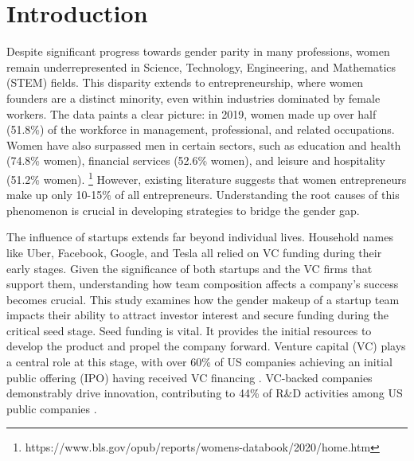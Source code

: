 

\pagestyle{plain} 


\section{Introduction} \label{sec:introduction}



Despite significant progress towards gender parity in many professions, women remain underrepresented in Science, Technology, Engineering, and Mathematics (STEM) fields. This disparity extends to entrepreneurship, where women founders are a distinct minority, even within industries dominated by female workers. The data paints a clear picture: in 2019, women made up over half (51.8\%) of the workforce in management, professional, and related occupations. Women have also surpassed men in certain sectors, such as education and health (74.8\% women), financial services (52.6\% women), and leisure and hospitality (51.2\% women). \footnote[1]{https://www.bls.gov/opub/reports/womens-databook/2020/home.htm} However, existing literature suggests that women entrepreneurs make up only 10-15\% of all entrepreneurs. Understanding the root causes of this phenomenon is crucial in developing strategies to bridge the gender gap.

The influence of startups extends far beyond individual lives. Household names like Uber, Facebook, Google, and Tesla all relied on VC funding during their early stages. Given the significance of both startups and the VC firms that support them, understanding how team composition affects a company's success becomes crucial. This study examines how the gender makeup of a startup team impacts their ability to attract investor interest and secure funding during the critical seed stage. Seed funding is vital. It provides the initial resources to develop the product and propel the company forward. Venture capital (VC) plays a central role at this stage, with over 60\% of US companies achieving an initial public offering (IPO) having received VC financing \citep{kaplan2010}. VC-backed companies demonstrably drive innovation, contributing to 44\% of R\&D activities among US public companies \cite{gornall2020}.

